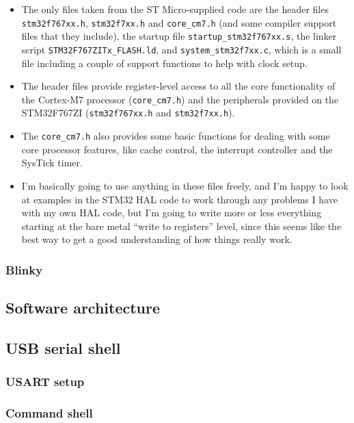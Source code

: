 \documentclass[a4paper,11pt,article]{memoir}
\begin{document}
\begin{itemize}
  \item{The only files taken from the ST Micro-supplied code are the
    header files \texttt{stm32f767xx.h}, \texttt{stm32f7xx.h} and
    \texttt{core\_cm7.h} (and some compiler support files that they
    include), the startup file \texttt{startup\_stm32f767xx.s}, the
    linker script \texttt{STM32F767ZITx\_FLASH.ld}, and
    \texttt{system\_stm32f7xx.c}, which is a small file including a
    couple of support functions to help with clock setup.}
  \item{The header files provide register-level access to all the core
    functionality of the Cortex-M7 processor (\texttt{core\_cm7.h})
    and the peripherals provided on the STM32F767ZI
    (\texttt{stm32f767xx.h} and \texttt{stm32f7xx.h}).}
  \item{The \texttt{core\_cm7.h} also provides some basic functions
    for dealing with some core processor features, like cache control,
    the interrupt controller and the SysTick timer.}
  \item{I'm basically going to use anything in these files freely, and
    I'm happy to look at examples in the STM32 HAL code to work
    through any problems I have with my own HAL code, but I'm going to
    write more or less everything starting at the bare metal ``write
    to registers'' level, since this seems like the best way to get a
    good understanding of how things really work.}
\end{itemize}

\subsubsection{Blinky}


\subsection{Software architecture}


\subsection{USB serial shell}

\subsubsection{USART setup}


\subsubsection{Command shell}
\end{document}
